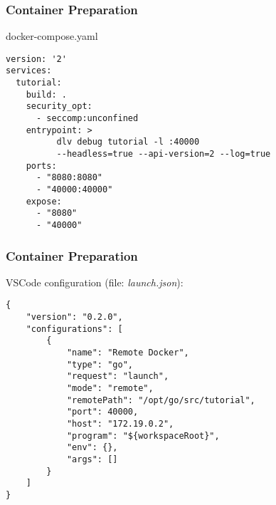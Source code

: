 \documentclass[pdf,xcolor=dvipsnames]{beamer}
\begin{document}
\begin{frame}
  \frametitle{Container Preparation}
  docker-compose.yaml
\begin{lstlisting}
version: '2'
services:
  tutorial:
    build: .
    security_opt:
      - seccomp:unconfined
    entrypoint: >
          dlv debug tutorial -l :40000 
          --headless=true --api-version=2 --log=true
    ports:
      - "8080:8080"
      - "40000:40000"
    expose:
      - "8080"
      - "40000"
\end{lstlisting}
\end{frame}

\begin{frame}[fragile]
  \frametitle{Container Preparation}
  VSCode configuration (file: \emph{launch.json}):
\begin{lstlisting}[]
{
    "version": "0.2.0",
    "configurations": [
        {
            "name": "Remote Docker",
            "type": "go",
            "request": "launch",
            "mode": "remote",
            "remotePath": "/opt/go/src/tutorial",
            "port": 40000,
            "host": "172.19.0.2",
            "program": "${workspaceRoot}",
            "env": {},
            "args": []
        }
    ]
}
\end{lstlisting}
\end{frame}

\end{document}
